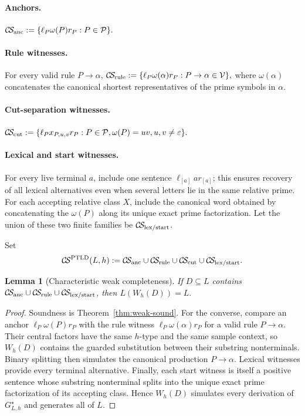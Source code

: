 \documentclass[11pt,a4paper]{article}
\newtheorem{lemma}[theorem]{Lemma}
\newcommand{\eps}{\varepsilon}
\newcommand{\Pcal}{\mathcal P}
\newcommand{\Vcal}{\mathcal V}
\newcommand{\CS}{\mathcal{C}\!\mathcal{S}}
\begin{document}
\paragraph{Anchors.}
\(\CS_{\rm anc} := \{\ell_P\omega(P)r_P:P\in\Pcal\}.\)

\paragraph{Rule witnesses.}
For every valid rule $P\to\alpha$,
\(\CS_{\rm rule} := \{\ell_P\omega(\alpha)r_P:P\to\alpha\in\Vcal\},\)
where $\omega(\alpha)$ concatenates the canonical shortest representatives of the prime symbols in $\alpha$.

\paragraph{Cut-separation witnesses.}
\(\CS_{\rm cut} := \{\ell_Px_{P,u,v}r_P: P\in\Pcal, \omega(P)=uv, u,v\ne\eps\}.\)

\paragraph{Lexical and start witnesses.}
For every live terminal $a$, include one sentence $\ell_{[a]}a r_{[a]}$; this ensures recovery of all lexical alternatives even when several letters lie in the same relative prime.  For each accepting relative class $X$, include the canonical word obtained by concatenating the $\omega(P)$ along its unique exact prime factorization.  Let the union of these two finite families be $\CS_{\rm lex/start}$.

Set
\[
  \CS^{\rm PTLD}(L,h)
  :=
  \CS_{\rm anc}
  \cup\CS_{\rm rule}
  \cup\CS_{\rm cut}
  \cup\CS_{\rm lex/start}.
\]

\begin{lemma}[Characteristic weak completeness]
\label{lem:weak-core}
If $D\subseteq L$ contains $\CS_{\rm anc}\cup\CS_{\rm rule}\cup\CS_{\rm lex/start}$, then
\(L(W_h(D))=L.\)
\end{lemma}

\begin{proof}
Soundness is Theorem~\ref{thm:weak-sound}.  For the converse, compare an anchor $\ell_P\omega(P)r_P$ with the rule witness $\ell_P\omega(\alpha)r_P$ for a valid rule $P\to\alpha$.  Their central factors have the same $h$-type and the same sample context, so $W_h(D)$ contains the guarded substitution between their substring nonterminals.  Binary splitting then simulates the canonical production $P\to\alpha$.  Lexical witnesses provide every terminal alternative.  Finally, each start witness is itself a positive sentence whose substring nonterminal splits into the unique exact prime factorization of its accepting class.  Hence $W_h(D)$ simulates every derivation of $G^\star_{L,h}$ and generates all of $L$.
\end{proof}
\end{document}
